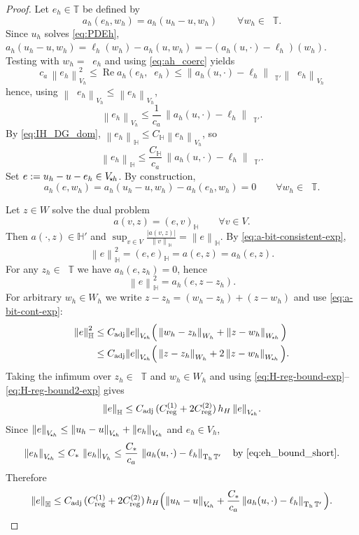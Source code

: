 \documentclass[11pt]{article}
\theoremstyle{definition}
\theoremstyle{plain}
\newcommand{\ca}{c_a}
\newcommand{\CD}{C_*}
\newcommand{\Vsh}{V_{\!\star \hspace*{-0.2mm}h}}
\newcommand{\Wsh}{W_{\!\star \hspace*{-0.2mm}h}}
\newcommand{\dgnorm}[1]{\norm{#1}_{V_h}}
\newcommand{\tdgnorm}[1]{{\Vert#1\Vert}_{\Vsh}}
\renewcommand{\Re}{\operatorname{Re}}
\DeclareMathOperator{\tch}{T_h}
\newcommand*{\norm}[1]{\left\|#1\right\|}
\newcommand{\IH}{\mathbb{H}}
\newcommand{\ITh}{\mathbb{T}}
\begin{document}
\begin{proof}
Let $e_h\in\ITh$ be defined by
\[
a_h(e_h,w_h)=a_h(u_h-u,w_h)\qquad\forall w_h\in\tch\ITh .
\]
Since $u_h$ solves \eqref{eq:PDEh}, $a_h(u_h-u,w_h)=\ell_h(w_h)-a_h(u,w_h)=-(a_h(u,\cdot)-\ell_h)(w_h)$.
Testing with $w_h=\tch e_h$ and using \eqref{eq:ah_coerc} yields
\[
\ca\,\dgnorm{e_h}^2\le \Re a_h(e_h,\tch e_h)
\le \norm{a_h(u,\cdot)-\ell_h}_{\tch\ITh'}\dgnorm{\tch e_h}
\]
hence, using $\dgnorm{\tch e_h}\le \dgnorm{e_h}$,
\begin{equation}\label{eq:eh_bound_short}
\dgnorm{e_h}\le \frac1{\ca}\,\norm{a_h(u,\cdot)-\ell_h}_{\tch\ITh'}.
\end{equation}
By \eqref{eq:IH_DG_dom}, $\norm{e_h}_{\IH}\le C_{\IH}\dgnorm{e_h}$, so
\begin{equation}\label{eq:eh_IH_bound_short}
\norm{e_h}_{\IH}\le \frac{C_{\IH}}{\ca}\,\norm{a_h(u,\cdot)-\ell_h}_{\tch\ITh'}.
\end{equation}
Set $e:=u_h-u-e_h\in\Vsh$. By construction,
\[
a_h(e,w_h)=a_h(u_h-u,w_h)-a_h(e_h,w_h)=0\qquad\forall w_h\in\tch\ITh.
\]

Let $z\in W$ solve the dual problem
\[
a(v,z)=(e,v)_{\IH}\qquad\forall v\in V.
\]
Then $a(\cdot,z)\in\IH'$ and
$\sup_{v\in V}\frac{|a(v,z)|}{\norm{v}_{\IH}}=\norm{e}_{\IH}$.
By \eqref{eq:a-bit-consistent-exp},
\[
\norm{e}_{\IH}^2=(e,e)_{\IH}=a(e,z)=a_h(e,z).
\]
For any $z_h\in\tch\ITh$ we have $a_h(e,z_h)=0$, hence
\[
\norm{e}_{\IH}^2=a_h(e,z-z_h).
\]
For arbitrary $w_h\in W_h$ we write $z-z_h=(w_h-z_h)+(z-w_h)$ and use \eqref{eq:a-bit-cont-exp}:
\begin{align*}
\norm{e}_{\IH}^2
&\le C_{\rm adj}\tdgnorm{e}\Big(\norm{w_h-z_h}_{W_h}+\norm{z-w_h}_{\Wsh}\Big)\\
&\le C_{\rm adj}\tdgnorm{e}\Big(\norm{z-z_h}_{W_h}+2\norm{z-w_h}_{\Wsh}\Big).
\end{align*}
Taking the infimum over $z_h\in\tch\ITh$ and $w_h\in W_h$ and using
\eqref{eq:H-reg-bound-exp}--\eqref{eq:H-reg-bound2-exp} gives
\[
\norm{e}_{\IH}\le C_{\rm adj}\,(C_{\rm reg}^{(1)}+2C_{\rm reg}^{(2)})\,h_H\,\tdgnorm{e}.
\]
Since $\tdgnorm{e}\le \tdgnorm{u_h-u}+\tdgnorm{e_h}$ and $e_h\in V_h$,
\[
\tdgnorm{e_h}\le \CD\,\dgnorm{e_h}\le \frac{\CD}{\ca}\,\norm{a_h(u,\cdot)-\ell_h}_{\tch\ITh'}
\quad\text{by }\eqref{eq:eh_bound_short}.
\]
Therefore
\begin{equation}\label{eq:e_IH_bound_short}
\norm{e}_{\IH}\le C_{\rm adj}\,(C_{\rm reg}^{(1)}+2C_{\rm reg}^{(2)})\,h_H
\Big(\tdgnorm{u_h-u}+\frac{\CD}{\ca}\norm{a_h(u,\cdot)-\ell_h}_{\tch\ITh'}\Big).
\end{equation}


\end{proof}
\end{document}
